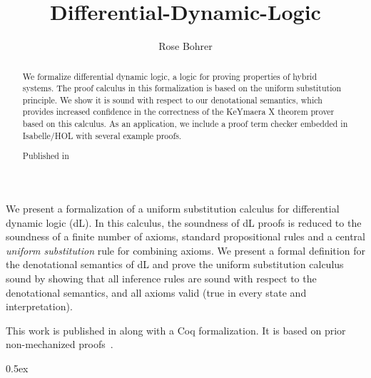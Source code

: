 \documentclass[11pt,a4paper]{article}
\begin{document}
\title{Differential-Dynamic-Logic}
\author{Rose Bohrer}
\maketitle

\begin{abstract}
 We formalize differential dynamic logic, a logic for proving
 properties of hybrid systems. The proof calculus in this
 formalization is based on the uniform substitution principle. We show
 it is sound with respect to our denotational semantics, which
 provides increased confidence in the correctness of the KeYmaera X
 theorem prover based on this calculus. As an application, we include
 a proof term checker embedded in Isabelle/HOL with several example
 proofs.

Published in \cite{BohrerCPP17}
\end{abstract}

  We present a formalization of a uniform substitution calculus for
  differential dynamic logic (dL). In this calculus, the soundness of dL
  proofs is reduced to the soundness of a finite number of axioms, standard
  propositional rules and a central \textit{uniform substitution} rule for
  combining axioms. We present a formal definition for the denotational
  semantics of dL and prove the uniform substitution calculus sound by showing
  that all inference rules are sound with respect to the denotational
  semantics, and all axioms valid (true in every state and interpretation).

  This work is published in \cite{BohrerCPP17} along with a Coq formalization.
  It is based on prior non-mechanized proofs~\cite{DBLP:journals/jar/Platzer16,DBLP:conf/cade/Platzer15}.

\tableofcontents

\parindent 0pt\parskip 0.5ex





\end{document}
